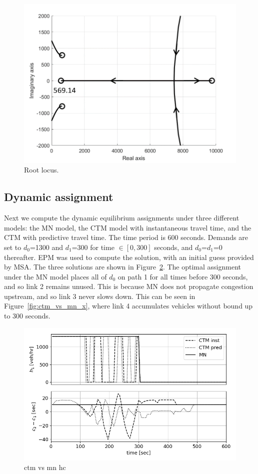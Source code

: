 \begin{figure}[h]
    \centering
    \includegraphics[width=0.8\linewidth]{figs/rlocus_mod.png}
    \caption{Root locus.}
    \label{fig:rlocus}
\end{figure}

\subsection{Dynamic assignment}
Next we compute the dynamic equilibrium assignments under three different models: the MN model, the CTM model with instantaneous travel time, and the CTM with predictive travel time. The time period is 600 seconds. Demands are set to $d_0$=1300 and $d_1$=300 for time $\in[0,300]$ seconds, and $d_0$=$d_1$=0 thereafter. EPM was used to compute the solution, with an initial guess provided by MSA. The three solutions are shown in Figure~\ref{fig:ctm_vs_mn_hc}. The optimal assignment under the MN model places all of $d_0$ on path 1 for all times before 300 seconds, and so link 2 remains unused. This is because MN does not propagate congestion upstream, and so link 3 never slows down. This can be seen in Figure~\ref{fig:ctm_vs_mn_x}, where link 4 accumulates vehicles without bound up to 300 seconds. 
\begin{figure}[h]
    \centering
    \includegraphics[width=\linewidth]{figs/ctm_vs_mn_hc.png}
    \caption{ctm vs mn hc}
    \label{fig:ctm_vs_mn_hc}
\end{figure}

